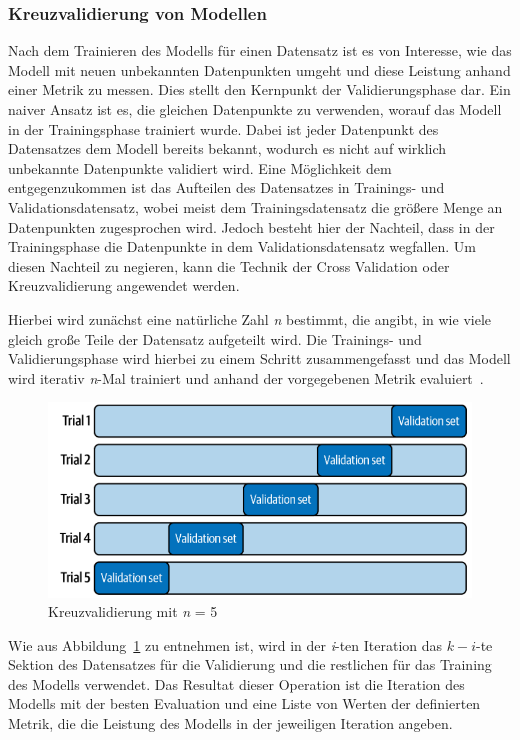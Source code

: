 \subsubsection{Kreuzvalidierung von Modellen}
Nach dem Trainieren des Modells für einen Datensatz ist es von Interesse, wie das Modell mit neuen unbekannten Datenpunkten umgeht und diese Leistung anhand einer Metrik zu messen.
Dies stellt den Kernpunkt der Validierungsphase dar. Ein naiver Ansatz ist es, die gleichen Datenpunkte zu verwenden, worauf das Modell in der Trainingsphase trainiert wurde.
Dabei ist jeder Datenpunkt des Datensatzes dem Modell bereits bekannt, wodurch es nicht auf wirklich unbekannte Datenpunkte validiert wird.
Eine Möglichkeit dem entgegenzukommen ist das Aufteilen des Datensatzes in Trainings- und Validationsdatensatz, wobei meist dem Trainingsdatensatz die größere Menge an Datenpunkten zugesprochen wird.
Jedoch besteht hier der Nachteil, dass in der Trainingsphase die Datenpunkte in dem Validationsdatensatz wegfallen.
Um diesen Nachteil zu negieren, kann die Technik der Cross Validation oder Kreuzvalidierung angewendet werden.

Hierbei wird zunächst eine natürliche Zahl \textit{n} bestimmt, die angibt, in wie viele gleich große Teile der Datensatz aufgeteilt wird.
Die Trainings- und Validierungsphase wird hierbei zu einem Schritt zusammengefasst und das Modell wird iterativ \textit{n}-Mal trainiert und anhand der vorgegebenen Metrik evaluiert~\cite[S. 387]{10.5555/3133359}.

\begin{figure}[h]
    \centering
    \includegraphics[scale=0.5]{figures/cross_validation}
    \caption{Kreuzvalidierung mit \textit{n} = 5}
    \label{fig:cross_validation}
\end{figure}
Wie aus Abbildung~\ref{fig:cross_validation} zu entnehmen ist, wird in der \textit{i}-ten Iteration das $k-i$-te Sektion des Datensatzes für die Validierung und die restlichen
für das Training des Modells verwendet. Das Resultat dieser Operation ist die Iteration des Modells mit der besten Evaluation und eine Liste von Werten der definierten Metrik, die die Leistung des Modells in der jeweiligen Iteration angeben.

